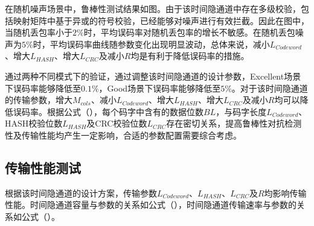 在随机噪声场景中，鲁棒性测试结果如图。由于该时间隐通道中存在多级校验，包括映射矩阵中基于异或的符号校验，已经能够对噪声进行有效拦截。因此在图中，当随机丢包率小于$2\%$时，平均误码率对随机丢包率的增长不敏感。在随机丢包噪声为$5\%$时，平均误码率曲线随参数变化出现明显波动，总体来说，减小$L_{Codeword}$、增大$L_{HASH}$、增大$L_{CRC}$及减小$R$均是有利于降低误码率的措施。

通过两种不同模式下的验证，通过调整该时间隐通道的设计参数，Excellent场景下误码率能够降低至$0.1\%$，Good场景下误码率能够降低至$5\%$。对于该时间隐通道的传输参数，增大$M_{cols}$、减小$L_{Codeword}$、增大$L_{HASH}$、增大$L_{CRC}$及减小$R$均可以降低误码率。根据公式（），每个码字中含有的数据位数$BL$，与码字长度$L_{Codeword}$、HASH校验位数$L_{HASH}$及CRC校验位数$L_{CRC}$存在密切关系，提高鲁棒性对抗检测性及传输性能均产生一定影响，合适的参数配置需要综合考虑。

\subsection{传输性能测试}
\label{chap:hash:result:throughput}

根据该时间隐通道的设计方案，传输参数$L_{Codeword}$、$L_{HASH}$、$L_{CRC}$及$R$均影响传输性能。时间隐通道容量与参数的关系如公式（），时间隐通道传输速率与参数的关系如公式（）。


